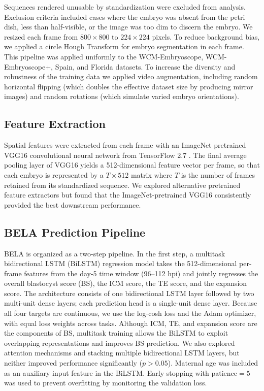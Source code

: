 \documentclass[11pt,a4paper]{article}
\begin{document}
Sequences rendered unusable by standardization were excluded from
analysis. Exclusion criteria included cases where the embryo was absent
from the petri dish, less than half-visible, or the image was too dim to
discern the embryo. We resized each frame from $800 \times 800$ to
$224 \times 224$ pixels. To reduce background bias, we applied a circle
Hough Transform for embryo segmentation in each frame. This pipeline was
applied uniformly to the WCM-Embryoscope, WCM-Embryoscope+, Spain, and
Florida datasets. To increase the diversity and robustness of the
training data we applied video augmentation, including random horizontal
flipping (which doubles the effective dataset size by producing mirror
images) and random rotations (which simulate varied embryo orientations).

\subsection{Feature Extraction}

Spatial features were extracted from each frame with an ImageNet
pretrained VGG16 convolutional neural network from TensorFlow 2.7
\cite{simonyan2014very}. The final average pooling layer of VGG16 yields a
512-dimensional feature vector per frame, so that each embryo is
represented by a $T \times 512$ matrix where $T$ is the number of frames
retained from its standardized sequence. We explored alternative
pretrained feature extractors but found that the ImageNet-pretrained VGG16
consistently provided the best downstream performance.

\subsection{BELA Prediction Pipeline}

BELA is organized as a two-step pipeline. In
the first step, a multitask bidirectional LSTM (BiLSTM) regression model
takes the 512-dimensional per-frame features from the day-5 time window
(96--112 hpi) and jointly regresses the overall blastocyst score (BS), the
ICM score, the TE score, and the expansion score. The architecture
consists of one bidirectional LSTM layer followed by two multi-unit dense
layers; each prediction head is a single-unit dense layer. Because all
four targets are continuous, we use the log-cosh loss and the Adam
optimizer, with equal loss weights across tasks. Although ICM, TE, and
expansion score are the components of BS, multitask training allows the
BiLSTM to exploit overlapping representations and improves BS prediction.
We also explored attention mechanisms and stacking multiple bidirectional
LSTM layers, but neither improved performance significantly ($p > 0.05$).
Maternal age was included as an auxiliary input feature in the BiLSTM.
Early stopping with patience$=5$ was used to prevent overfitting by
monitoring the validation loss.
\end{document}
